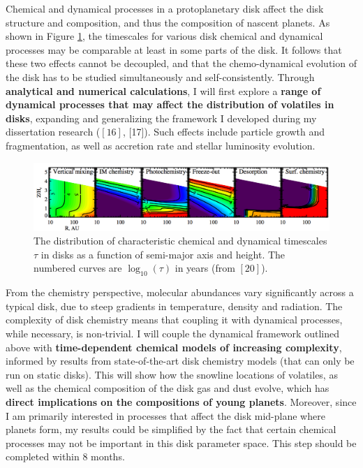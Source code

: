 \documentclass[12pt, letterpaper]{article}
\begin{document}
Chemical and dynamical processes in a protoplanetary disk affect the disk structure and composition, and thus the composition of nascent planets. As shown in Figure \ref{fig:chemical}, the timescales for various disk chemical and dynamical processes may be comparable at least in some parts of the disk. It follows that these two effects cannot be decoupled, and that the chemo-dynamical evolution of the disk has to be studied simultaneously and self-consistently. Through \textbf{analytical and numerical calculations}, I will first explore a \textbf{range of dynamical processes that may affect the distribution of volatiles in disks}, expanding and generalizing the framework I developed during my dissertation research ($[16]$, [17]). Such effects include particle growth and fragmentation, as well as accretion rate and stellar luminosity evolution.   

\begin{figure}[h!]
\centering
\includegraphics[width=\textwidth]{chemical_timescales}
\vspace{-0.3in}
\caption{The distribution of characteristic chemical and dynamical timescales $\tau$ in disks as a function of semi-major axis and height. The numbered curves are $\log_{10} (\tau)$ in years (from $[20]$).}
\label{fig:chemical}
\end{figure}

From the chemistry perspective, molecular abundances vary significantly across a typical disk, due to steep gradients in temperature, density and radiation. 
The complexity of disk chemistry means that coupling it with dynamical processes, while necessary, is non-trivial.  I will couple the dynamical framework outlined above with \textbf{time-dependent chemical models of increasing complexity}, informed by results from state-of-the-art disk chemistry models (that can only be run on static disks). This will show how the snowline locations of volatiles, as well as the chemical composition of the disk gas and dust evolve, which has \textbf{direct implications on the compositions of young planets}. Moreover, since I am primarily interested in processes that affect the disk mid-plane where planets form, my results could be simplified by the fact that certain chemical processes may not be important in this disk parameter space. This step should be completed within 8 months.
\end{document}
